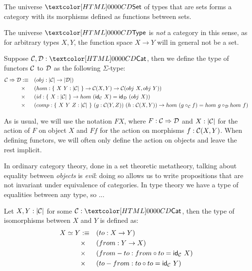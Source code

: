 \begin{example}
  The universe $\Set$ of types that are sets forms a category with its
  morphisms defined as functions between sets.
\end{example}

\begin{remark}
  The universe $\Type$ is \emph{not} a category in this sense, as for
  arbitrary types $X, Y$, the function space $X \to Y$ will in general
  not be a set.
\end{remark}

\begin{definition}[Functor]
  Suppose $\Cc, \Dd : \Cat$, then we define the type of functors $\mathcal{C}$
  to $\mathcal{D}$ as the following $\Sigma$-type:
  \begin{align*}
    \Func{\Cc}{\Dd} &\ddefeq &&(obj : | \Cc | \to | \Dd |) \\
    &\times &&(hom : \{\ X\ Y : | \Cc |\ \} \to \Cc(X,Y) \to \Cc(obj\ X, obj\ Y)) \\
    &\times &&(id : \{\ X : | \Cc |\ \} \to hom\ (\id_{\Cc}\ X) = \id_{\Dd}\ (obj\ X)) \\
    &\times &&(comp : \{\ X\ Y\ Z : | \Cc |\ \}\ (g : \Cc(Y,Z))\ (h : \Cc(X,Y)) \to hom\ (g \circ_{\Cc} f) = hom\ g \circ_{\Dd} hom\ f)
  \end{align*}
\end{definition}

As is usual, we will use the notation $F X$, where
$F : \mathcal{C} \Rightarrow \mathcal{D}$ and $X : | \mathcal{C} |$ for the action of $F$ on
object $X$ and $F f$ for the action on morphisms $f : \mathcal{C}(X,Y)$. When
defining functors, we will often only define the action on objects and
leave the rest implicit.

In ordinary category theory, done in a set theoretic metatheory,
talking about equality between \emph{objects} is \emph{evil}: doing so
allows us to write propositions that are not invariant under
equivalence of categories. In type theory we have a type of equalities
between any type, so ...

\begin{definition}[Isomorphism]
  Let $X, Y : | \mathcal{C} |$ for some $\Cc : \Cat$, then the type of
  isomorphisms between $X$ and $Y$ is defined as:
  \begin{align*}
    \Iso{X}{Y} &\ddefeq &&(to : X \to Y) \\
               &\times &&(from : Y \to X) \\
               &\times &&(from-to : from \circ to = \id_{\Cc}\ X) \\
               &\times &&(to-from : to \circ to = \id_{\Cc}\ Y)
  \end{align*}
\end{definition}

